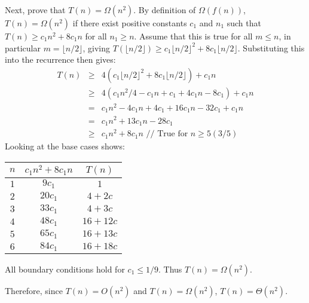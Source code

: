 Next, prove that $T(n) = \Omega(n^2)$.  By definition of $\Omega(f(n))$, $T(n) = \Omega(n^2)$ if there exist positive constants $c_1$ and $n_1$ such that $T(n) \geq c_1n^2 + 8c_1n$ for all $n_1 \geq n$.  Assume that this is true for all $m \leq n$, in particular $m = \lfloor n/2 \rfloor$, giving $T(\lfloor n/2 \rfloor) \geq c_1\lfloor n/2 \rfloor^2 + 8c_1 \lfloor n/2 \rfloor$.  Substituting this into the recurrence then gives:
\begin{eqnarray*}
	T(n) & \geq & 4(c_1 \lfloor n/2 \rfloor^2 + 8c_1\lfloor n/2 \rfloor) + c_1n \\
	& \geq & 4(c_1n^2/4 - c_1n + c_1 + 4c_1n - 8c_1) + c_1n \\
	& = & c_1n^2 - 4c_1n + 4c_1 + 16c_1n - 32c_1 + c_1n \\
	& = & c_1n^2 + 13c_1n - 28c_1 \\
	& \geq & c_1n^2 + 8c_1n \text{~// True for $n \geq 5(3/5)$}
\end{eqnarray*}
Looking at the base cases shows:
\begin{center}
\begin{tabular}{c|c|c}
	$n$ & $c_1n^2 + 8c_1n$ & $T(n)$ \\ \hline
	$1$ & $9c_1$ & $1$ \\
	$2$ & $20c_1$ & $4 + 2c$ \\
	$3$ & $33c_1$ & $4 + 3c$ \\
	$4$ & $48c_1$ & $16 + 12c$ \\
	$5$ & $65c_1$ & $16 + 13c$ \\
	$6$ & $84c_1$ & $16 + 18c$
\end{tabular}
\end{center}
All boundary conditions hold for $c_1 \leq 1/9$.  Thus $T(n) = \Omega(n^2)$.

Therefore, since $T(n) = O(n^2)$ and $T(n) = \Omega(n^2)$, $T(n) = \Theta(n^2)$.
